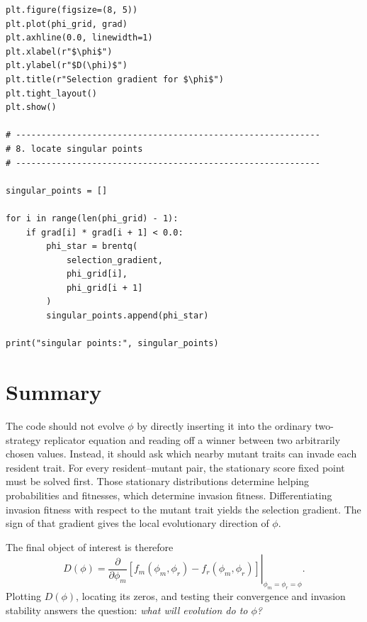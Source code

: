 \documentclass[11pt]{article}
\begin{document}
\begin{lstlisting}
plt.figure(figsize=(8, 5))
plt.plot(phi_grid, grad)
plt.axhline(0.0, linewidth=1)
plt.xlabel(r"$\phi$")
plt.ylabel(r"$D(\phi)$")
plt.title(r"Selection gradient for $\phi$")
plt.tight_layout()
plt.show()

# ------------------------------------------------------------
# 8. locate singular points
# ------------------------------------------------------------

singular_points = []

for i in range(len(phi_grid) - 1):
    if grad[i] * grad[i + 1] < 0.0:
        phi_star = brentq(
            selection_gradient,
            phi_grid[i],
            phi_grid[i + 1]
        )
        singular_points.append(phi_star)

print("singular points:", singular_points)
\end{lstlisting}

\section{Summary}

The code should not evolve $\phi$ by directly inserting it into the ordinary two-strategy replicator equation and reading off a winner between two arbitrarily chosen values. Instead, it should ask which nearby mutant traits can invade each resident trait. For every resident--mutant pair, the stationary score fixed point must be solved first. Those stationary distributions determine helping probabilities and fitnesses, which determine invasion fitness. Differentiating invasion fitness with respect to the mutant trait yields the selection gradient. The sign of that gradient gives the local evolutionary direction of $\phi$.

The final object of interest is therefore
\[
\boxed{
D(\phi)
=
\left.
\frac{\partial}{\partial\phi_m}
\left[f_m(\phi_m,\phi_r)-f_r(\phi_m,\phi_r)\right]
\right|_{\phi_m=\phi_r=\phi}.
}
\]
Plotting $D(\phi)$, locating its zeros, and testing their convergence and invasion stability answers the question: \emph{what will evolution do to $\phi$?}
\end{document}
